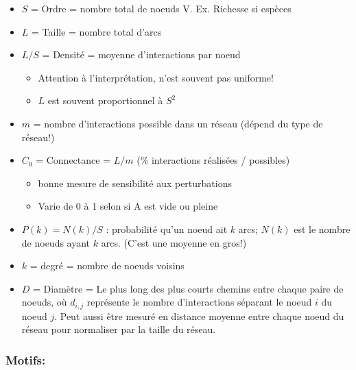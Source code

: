 \documentclass[
]{article}
\providecommand{\tightlist}{%
  \setlength{\itemsep}{0pt}\setlength{\parskip}{0pt}}
\begin{document}
\begin{itemize}
\tightlist
\item
  \(S\) = Ordre = nombre total de noeuds V. Ex. Richesse si espèces
\item
  \(L\) = Taille = nombre total d'arcs
\item
  \(L/S\) = Densité = moyenne d'interactions par noeud

  \begin{itemize}
  \tightlist
  \item
    Attention à l'interprétation, n'est souvent pas uniforme!
  \item
    \(L\) est souvent proportionnel à \(S^2\)
  \end{itemize}
\item
  \(m\) = nombre d'interactions possible dans un réseau (dépend du type
  de réseau!)
\item
  \(C_0\) = Connectance = \(L/m\) (\% interactions réalisées /
  possibles)

  \begin{itemize}
  \tightlist
  \item
    bonne mesure de sensibilité aux perturbations
  \item
    Varie de 0 à 1 selon si A est vide ou pleine
  \end{itemize}
\item
  \(P(k) = N(k)/S\) : probabilité qu'un noeud ait \(k\) arcs; \(N(k)\)
  est le nombre de noeuds ayant \(k\) arcs. (C'est une moyenne en gros!)
\item
  \(k\) = degré = nombre de noeuds voisins
\item
  \(D\) = Diamètre = Le plus long des plus courts chemins entre chaque
  paire de noeuds, où \(d_{i,j}\) représente le nombre d'interactions
  séparant le noeud \(i\) du noeud \(j\). Peut aussi être mesuré en
  distance moyenne entre chaque noeud du réseau pour normaliser par la
  taille du réseau.
\end{itemize}

\hypertarget{motifs}{%
\subsubsection{Motifs:}\label{motifs}}
\end{document}
